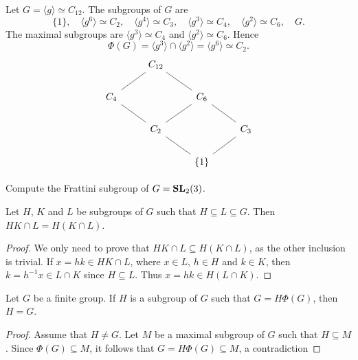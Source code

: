 \begin{example}
	Let $G=\langle g\rangle\simeq C_{12}$. The subgroups of $G$ are  
	\[
	\{1\},\quad
	\langle g^6\rangle\simeq C_2,\quad
	\langle g^4\rangle\simeq C_3,\quad
	\langle g^3\rangle\simeq C_4,\quad
	\langle g^2\rangle\simeq C_6,\quad
	G.
	\]
	The maximal subgroups are $\langle g^3\rangle\simeq C_4$ and $\langle
	g^2\rangle\simeq C_6$. Hence \[
	\Phi(G)=\langle g^3\rangle\cap \langle
	g^2\rangle=\langle g^6\rangle\simeq C_2.
	\] 
\[\begin{tikzcd}
	& {C_{12}} \\
	{C_4} && {C_6} \\
	& {C_2} && {C_3} \\
	&& {\{1\}}
	\arrow[no head, from=4-3, to=3-2]
	\arrow[no head, from=4-3, to=3-4]
	\arrow[no head, from=3-4, to=2-3]
	\arrow[no head, from=2-3, to=1-2]
	\arrow[no head, from=3-2, to=2-1]
	\arrow[no head, from=2-1, to=1-2]
	\arrow[no head, from=3-2, to=2-3]
\end{tikzcd}\]
\end{example}

\begin{exercise}
	Compute the Frattini subgroup of $G=\mathbf{SL}_2(3)$.  
\end{exercise}

\begin{lemma}[Dedekind]
	\label{lem:Dedekind}
	Let $H$, $K$ and $L$ be subgroups of $G$ such that $H\subseteq L\subseteq G$. Then
	$HK\cap L=H(K\cap L)$.
\end{lemma}

\begin{proof}
	We only need to prove that $HK\cap L\subseteq H(K\cap L)$, 
	as the other inclusion is trivial. If 
	$x=hk\in HK\cap L$, where $x\in L$, $h\in H$ and $k\in K$,
	then $k=h^{-1}x\in L\cap K$ since $H\subseteq L$. Thus $x=hk\in H(L\cap
	K)$.
\end{proof}

\begin{lemma}
	\label{lem:G=HPhi(G)}
	Let $G$ be a finite group. If $H$ is a subgroup of $G$ such that $G=H\Phi(G)$,
	then $H=G$.
\end{lemma}

\begin{proof}
	Assume that $H\ne G$. Let $M$ be a maximal subgroup of $G$ such that
	$H\subseteq M$. Since $\Phi(G)\subseteq M$, it follows that $G=H\Phi(G)\subseteq M$, a contradiction
\end{proof}

